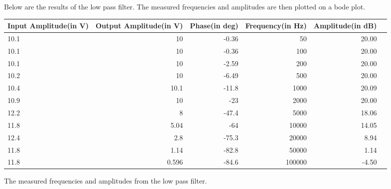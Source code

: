 Below are the results of the low pass filter. The measured frequencies and amplitudes are then plotted on a bode plot.

\begin{adjustwidth}{-2.5 cm}{-2.5 cm}\centering\begin{threeparttable}[!htb]
        \scriptsize
        \begin{tabular}{lrrrrr}\toprule
            \textbf{Input Amplitude(in V)} & \textbf{Output Amplitude(in V)} & \textbf{Phase(in deg)} & \textbf{Frequency(in Hz)} & \textbf{Amplitude(in dB)} \\\midrule
            10.1                           & 10                              & -0.36                  & 50                        & 20.00                     \\
            10.1                           & 10                              & -0.36                  & 100                       & 20.00                     \\
            10.1                           & 10                              & -2.59                  & 200                       & 20.00                     \\
            10.2                           & 10                              & -6.49                  & 500                       & 20.00                     \\
            10.4                           & 10.1                            & -11.8                  & 1000                      & 20.09                     \\
            10.9                           & 10                              & -23                    & 2000                      & 20.00                     \\
            12.2                           & 8                               & -47.4                  & 5000                      & 18.06                     \\
            11.8                           & 5.04                            & -64                    & 10000                     & 14.05                     \\
            12.4                           & 2.8                             & -75.3                  & 20000                     & 8.94                      \\
            11.8                           & 1.14                            & -82.8                  & 50000                     & 1.14                      \\
            11.8                           & 0.596                           & -84.6                  & 100000                    & -4.50                     \\
            \bottomrule
        \end{tabular}
        \caption{The measured frequencies and amplitudes from the low pass filter.}\label{tab: }
    \end{threeparttable}\end{adjustwidth}


